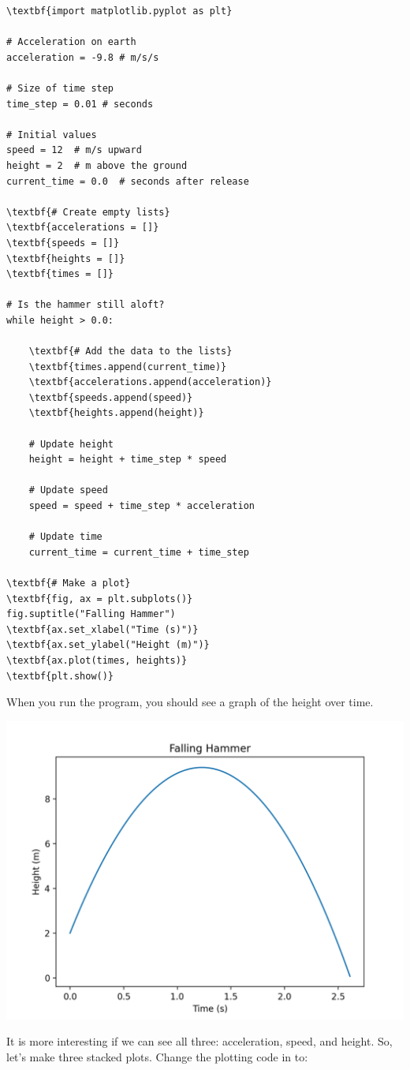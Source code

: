 \begin{Verbatim}[commandchars=\\\{\}]
\textbf{import matplotlib.pyplot as plt}

# Acceleration on earth
acceleration = -9.8 # m/s/s

# Size of time step
time_step = 0.01 # seconds

# Initial values
speed = 12  # m/s upward
height = 2  # m above the ground
current_time = 0.0  # seconds after release

\textbf{# Create empty lists}
\textbf{accelerations = []}
\textbf{speeds = []}
\textbf{heights = []}
\textbf{times = []}

# Is the hammer still aloft?
while height > 0.0:

    \textbf{# Add the data to the lists}
    \textbf{times.append(current_time)}
    \textbf{accelerations.append(acceleration)}
    \textbf{speeds.append(speed)}
    \textbf{heights.append(height)}
    
    # Update height
    height = height + time_step * speed

    # Update speed
    speed = speed + time_step * acceleration

    # Update time
    current_time = current_time + time_step

\textbf{# Make a plot}
\textbf{fig, ax = plt.subplots()}
fig.suptitle("Falling Hammer")
\textbf{ax.set_xlabel("Time (s)")}
\textbf{ax.set_ylabel("Height (m)")}
\textbf{ax.plot(times, heights)}
\textbf{plt.show()}
\end{Verbatim}

When you run the program, you should see a graph of the height over time.

\includegraphics[width=0.7\linewidth]{heightplot.png}

It is more interesting if we can see all three: acceleration, speed, and height. 
So, let's make three stacked plots. Change the plotting code in 
 to:

